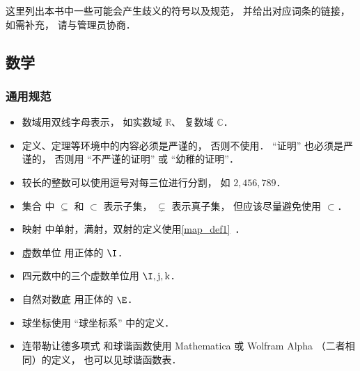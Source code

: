 
这里列出本书中一些可能会产生歧义的符号以及规范， 并给出对应词条的链接， 如需补充， 请与管理员协商．

\subsection{数学}
\subsubsection{通用规范}
\begin{itemize}
\item 数域用双线字母表示， 如实数域 $\mathbb R$、 复数域 $\mathbb C$．
\item 定义、定理等环境中的内容必须是严谨的， 否则不使用． “证明” 也必须是严谨的， 否则用 “不严谨的证明” 或 “幼稚的证明”．
\item 较长的整数可以使用逗号对每三位进行分割， 如 $2,456,789$．
\item 集合 中 $\subseteq$ 和 $\subset$ 表示子集， $\subsetneq$ 表示真子集， 但应该尽量避免使用 $\subset$．
\item 映射 中单射，满射，双射的定义使用\autoref{map_def1}~．
\item 虚数单位 用正体的 $\I$．
\item 四元数中的三个虚数单位用 $\I, \mathrm{j}, \mathrm{k}$．
\item 自然对数底 用正体的 $\E$．
\item 球坐标使用 “球坐标系” 中的定义．
\item 连带勒让德多项式 和球谐函数使用 Mathematica 或 Wolfram Alpha （二者相同）的定义， 也可以见球谐函数表．
\end{itemize}

